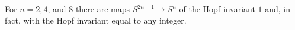 For $n = 2, 4$, and $8$ there are maps $S^{2n-1} \rightarrow S^n$ of the Hopf invariant $1$ and, in fact, with the Hopf invariant equal to any integer.
